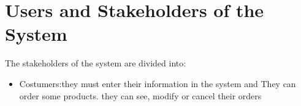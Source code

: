 \section{Users and Stakeholders of the System}
The stakeholders of the system are divided into:
\begin{itemize}
	\item Costumers:they must enter their information in the system and They can order some products. they can see, modify or cancel their orders
\end{itemize}